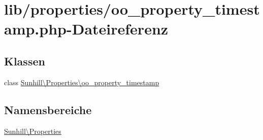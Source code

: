 \hypertarget{oo__property__timestamp_8php}{}\section{lib/properties/oo\+\_\+property\+\_\+timestamp.php-\/\+Dateireferenz}
\label{oo__property__timestamp_8php}
\subsection*{Klassen}
\begin{DoxyCompactItemize}
\item 
class \hyperlink{classSunhill_1_1Properties_1_1oo__property__timestamp}{Sunhill\textbackslash{}\+Properties\textbackslash{}oo\+\_\+property\+\_\+timestamp}
\end{DoxyCompactItemize}
\subsection*{Namensbereiche}
\begin{DoxyCompactItemize}
\item 
 \hyperlink{namespaceSunhill_1_1Properties}{Sunhill\textbackslash{}\+Properties}
\end{DoxyCompactItemize}
